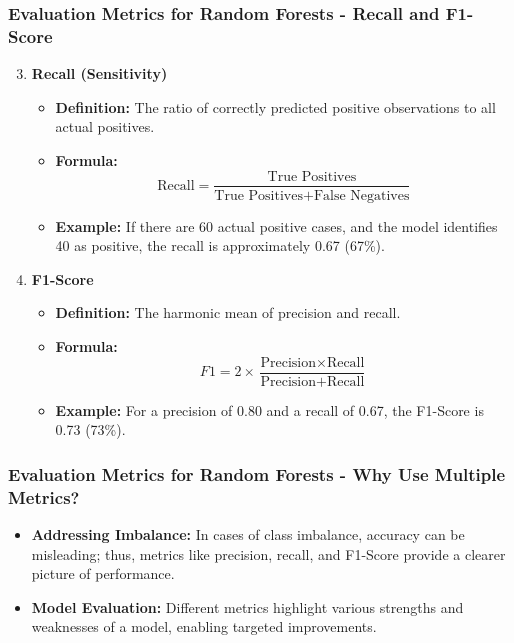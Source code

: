 \documentclass[aspectratio=169]{beamer}
\begin{document}
\begin{frame}
    \frametitle{Evaluation Metrics for Random Forests - Recall and F1-Score}
    \begin{enumerate}
        \setcounter{enumi}{2}
        \item \textbf{Recall (Sensitivity)}
        \begin{itemize}
            \item \textbf{Definition:} The ratio of correctly predicted positive observations to all actual positives.
            \item \textbf{Formula:}
            \begin{equation}
                \text{Recall} = \frac{\text{True Positives}}{\text{True Positives} + \text{False Negatives}}
            \end{equation}
            \item \textbf{Example:} If there are 60 actual positive cases, and the model identifies 40 as positive, the recall is approximately 0.67 (67\%).
        \end{itemize}
        
        \item \textbf{F1-Score}
        \begin{itemize}
            \item \textbf{Definition:} The harmonic mean of precision and recall.
            \item \textbf{Formula:}
            \begin{equation}
                F1 = 2 \times \frac{\text{Precision} \times \text{Recall}}{\text{Precision} + \text{Recall}}
            \end{equation}
            \item \textbf{Example:} For a precision of 0.80 and a recall of 0.67, the F1-Score is 0.73 (73\%).
        \end{itemize}
    \end{enumerate}
\end{frame}

\begin{frame}
    \frametitle{Evaluation Metrics for Random Forests - Why Use Multiple Metrics?}
    \begin{itemize}
        \item \textbf{Addressing Imbalance:} In cases of class imbalance, accuracy can be misleading; thus, metrics like precision, recall, and F1-Score provide a clearer picture of performance.
        \item \textbf{Model Evaluation:} Different metrics highlight various strengths and weaknesses of a model, enabling targeted improvements.
    \end{itemize}
\end{frame}
\end{document}
